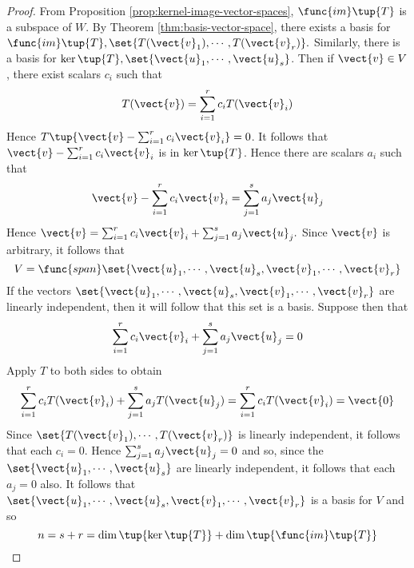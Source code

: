 \begin{proof}
From Proposition \ref{prop:kernel-image-vector-spaces}, $\func{im}\tup{T} $
is a subspace of $W$. By Theorem \ref{thm:basis-vector-space}, there exists a basis for $
\func{im}\tup{T} ,\set{T(\vect{v}_{1}),\cdots ,T(\vect{v}_{r})}
. $ Similarly, there is a basis for $\ker \tup{T} ,\set{\vect{u}
_{1},\cdots ,\vect{u}_{s}} $. Then if $\vect{v}\in V$, there exist
scalars $c_{i}$ such that 
\begin{equation*}
T(\vect{v})=\sum_{i=1}^{r}c_{i}T(\vect{v}_{i})
\end{equation*}
Hence $T\tup{\vect{v}-\sum_{i=1}^{r}c_{i}\vect{v}_{i}} =0$. It follows
that $\vect{v}-\sum_{i=1}^{r}c_{i}\vect{v}_{i}$ is in $\ker \tup{T} $.
Hence there are scalars $a_{i}$ such that 
\begin{equation*}
\vect{v}-\sum_{i=1}^{r}c_{i}\vect{v}_{i}=\sum_{j=1}^{s}a_{j}\vect{u}_{j}
\end{equation*}
Hence $\vect{v}=\sum_{i=1}^{r}c_{i}\vect{v}_{i}+\sum_{j=1}^{s}a_{j}\vect{u}
_{j}. $ Since $\vect{v}$ is arbitrary, it follows that 
\begin{equation*}
V=\func{span}\set{\vect{u}_{1},\cdots ,\vect{u}_{s},\vect{v}_{1},\cdots ,
\vect{v}_{r}}
\end{equation*}
If the vectors $\set{\vect{u}_{1},\cdots ,\vect{u}_{s},\vect{v}_{1},\cdots ,
\vect{v}_{r}} $ are linearly independent, then it will follow that
this set is a basis. Suppose then that 
\begin{equation*}
\sum_{i=1}^{r}c_{i}\vect{v}_{i}+\sum_{j=1}^{s}a_{j}\vect{u}_{j}=0
\end{equation*}
Apply $T$ to both sides to obtain 
\begin{equation*}
\sum_{i=1}^{r}c_{i}T(\vect{v}_{i})+\sum_{j=1}^{s}a_{j}T(\vect{u}
_{j})=\sum_{i=1}^{r}c_{i}T(\vect{v}_{i})= \vect{0}
\end{equation*}
Since $\set{T(\vect{v}_{1}),\cdots ,T(\vect{v}_{r})} $ is linearly
independent, it follows that each $c_{i}=0$. Hence $\sum_{j=1}^{s}a_{j}\vect{u
}_{j}=0$ and so, since the $\set{\vect{u}_{1},\cdots ,\vect{u}_{s}} $
are linearly independent, it follows that each $a_{j}=0$ also. It follows
that $\set{\vect{u}_{1},\cdots ,\vect{u}_{s},\vect{v}_{1},\cdots ,\vect{v}
_{r}} $ is a basis for $V$ and so 
\begin{equation*}
n=s+r=\dim \tup{\ker \tup{T} } +\dim \tup{\func{im}\tup{
T} }
\end{equation*}
\end{proof}

